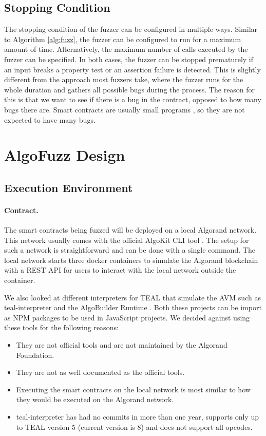 \subsection*{Stopping Condition}
The stopping condition of the fuzzer can be configured in multiple ways.
Similar to Algorithm \ref{alg:fuzz}, the fuzzer can be configured to run for a maximum amount of time.
Alternatively, the maximum number of calls executed by the fuzzer can be specified.
In both cases, the fuzzer can be stopped prematurely if an input breaks a property test or an assertion failure is detected.
This is slightly different from the approach most fuzzers take, where the fuzzer runs for the whole duration and gathers all possible bugs during the process.
The reason for this is that we want to see if there is a bug in the contract, opposed to how many bugs there are.
Smart contracts are usually small programs \cite{gao_checking_2021}, so they are not expected to have many bugs.

\section{AlgoFuzz Design}

\subsection*{Execution Environment}
\paragraph*{Contract.} The smart contracts being fuzzed will be deployed on a local Algorand network. This network usually comes with the official AlgoKit CLI tool \cite{noauthor_algokit_nodate}. The setup for such a network is straightforward and can be done with a single command. The local network starts three docker containers to simulate the Algorand blockchain with a \acs{REST} \acs{API} for users to interact with the local network outside the container.

We also looked at different interpreters for \ac{TEAL} that simulate the \ac{AVM} such as teal-interpreter \cite{noauthor_hone-labsteal-interpreter_nodate} and the AlgoBuilder Runtime \cite{noauthor_algo-builderruntime_nodate}.
Both these projects can be import as NPM packages to be used in JavaScript projects.
We decided against using these tools for the following reasons:
\begin{itemize}
    \item They are not official tools and are not maintained by the Algorand Foundation.
    \item They are not as well documented as the official tools.
    \item Executing the smart contracts on the local network is most similar to how they would be executed on the Algorand network.
    \item teal-interpreter has had no commits in more than one year, supports only up to \ac{TEAL} version 5 (current version is 8) and does not support all opcodes.
\end{itemize}

